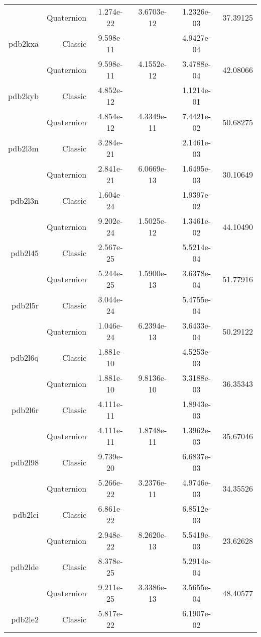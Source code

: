 \begin{xltabular}{\textwidth}{r|rS[table-format=1.3e+2]S[table-format=1.4e+2]S[table-format=1.4e+2]S[table-format=-1.5]}
& Quaternion & 1.274e-22 & 3.6703e-12 & 1.2326e-03 & 37.39125\\  \addlinespace
pdb2kxa & Classic & 9.598e-11 &  & 4.9427e-04 & \\
& Quaternion & 9.598e-11 & 4.1552e-12 & 3.4788e-04 & 42.08066\\  \addlinespace
pdb2kyb & Classic & 4.852e-12 &  & 1.1214e-01 & \\
& Quaternion & 4.854e-12 & 4.3349e-11 & 7.4421e-02 & 50.68275\\  \addlinespace
pdb2l3m & Classic & 3.284e-21 &  & 2.1461e-03 & \\
& Quaternion & 2.841e-21 & 6.0669e-13 & 1.6495e-03 & 30.10649\\  \addlinespace
pdb2l3n & Classic & 1.604e-24 &  & 1.9397e-02 & \\
& Quaternion & 9.202e-24 & 1.5025e-12 & 1.3461e-02 & 44.10490\\  \addlinespace
pdb2l45 & Classic & 2.567e-25 &  & 5.5214e-04 & \\
& Quaternion & 5.244e-25 & 1.5900e-13 & 3.6378e-04 & 51.77916\\  \addlinespace
pdb2l5r & Classic & 3.044e-24 &  & 5.4755e-04 & \\
& Quaternion & 1.046e-24 & 6.2394e-13 & 3.6433e-04 & 50.29122\\  \addlinespace
pdb2l6q & Classic & 1.881e-10 &  & 4.5253e-03 & \\
& Quaternion & 1.881e-10 & 9.8136e-10 & 3.3188e-03 & 36.35343\\  \addlinespace
pdb2l6r & Classic & 4.111e-11 &  & 1.8943e-03 & \\
& Quaternion & 4.111e-11 & 1.8748e-11 & 1.3962e-03 & 35.67046\\  \addlinespace
pdb2l98 & Classic & 9.739e-20 &  & 6.6837e-03 & \\
& Quaternion & 5.266e-22 & 3.2376e-11 & 4.9746e-03 & 34.35526\\  \addlinespace
pdb2lci & Classic & 6.861e-22 &  & 6.8512e-03 & \\
& Quaternion & 2.948e-22 & 8.2620e-13 & 5.5419e-03 & 23.62628\\  \addlinespace
pdb2lde & Classic & 8.378e-25 &  & 5.2914e-04 & \\
& Quaternion & 9.211e-25 & 3.3386e-13 & 3.5655e-04 & 48.40577\\  \addlinespace
pdb2le2 & Classic & 5.817e-22 &  & 6.1907e-02 & \\

\end{xltabular}
